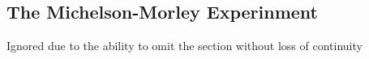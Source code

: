 \subsection{The Michelson-Morley Experinment}

Ignored due to the ability to omit the section without loss of continuity